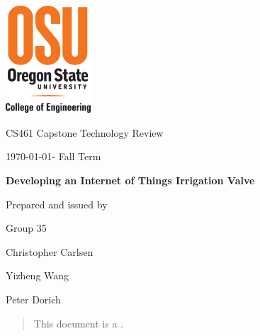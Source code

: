 \documentclass[onecolumn, draftclsnofoot,10pt, compsoc]{IEEEtran}
\def \CapstoneTeamName{     Group}
\def \CapstoneTeamNumber{       35}
\def \GroupMemberOne{           Christopher Carlsen}
\def \GroupMemberTwo{           Yizheng Wang}
\def \GroupMemberThree{         Peter Dorich}
\def \CapstoneProjectName{      Developing an Internet of Things Irrigation Valve}
\def \CapstoneSponsorCompany{       OSU \textbar\hspace{.05in} Openly Published Environmental Sensing (OPEnS) Lab}
\def \CapstoneSponsorPerson{        Chet Udell}
\def \DocType{      %
        Technology Review
    }
\newcommand{\NameSigPair}[1]{\par
        \makebox[2.75in][r]{#1} \hfil   \makebox[3.25in]{\makebox[2.25in]{\hrulefill} \hfill        \makebox[.75in]{\hrulefill}}
        \par\vspace{-12pt} \textit{\tiny\noindent
            \makebox[2.75in]{} \hfil        \makebox[3.25in]{\makebox[2.25in][r]{Signature} \hfill  \makebox[.75in][r]{Date}}}}
\renewcommand{\NameSigPair}[1]{#1}
\begin{document}
        \begin{titlepage}
            \begin{singlespace}
                \includegraphics[height=4cm]{coe_v_spot1}
                \hfill 
                \par\vspace{.2in}
                \centering
                \scshape{
                    \huge CS461 Capstone \DocType \par
                    {\large\today - Fall Term}\par
                    \vspace{.5in}
                    \textbf{\Huge\CapstoneProjectName}\par
                    \vfill
                    {\large Prepared and issued by }\par
                    Group\CapstoneTeamNumber\par
                    \vspace{5pt}
                    {\Large
                        \NameSigPair{\GroupMemberOne}\par
                        \NameSigPair{\GroupMemberTwo}\par
                        \NameSigPair{\GroupMemberThree}\par
                    }
                    \vspace{20pt}
                }
                \begin{abstract}
                    This document is a .
                \end{abstract}     
            \end{singlespace}
        \end{titlepage}
        \newpage
        \tableofcontents
        \clearpage
        
\end{document}
